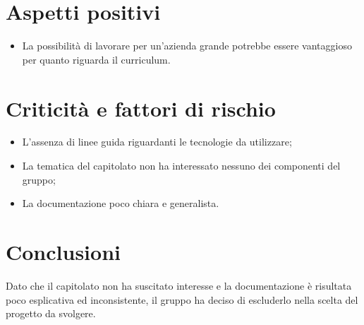 \section{Aspetti positivi}
\begin{itemize}
	\item La possibilità di lavorare per un'azienda grande potrebbe essere vantaggioso per quanto riguarda il curriculum.
\end{itemize}
\section{Criticità e fattori di rischio}
\begin{itemize}
	\item L'assenza di linee guida riguardanti le tecnologie da utilizzare;
	\item La tematica del capitolato non ha interessato nessuno dei componenti del gruppo;
	\item La documentazione poco chiara e generalista.
\end{itemize}
\section{Conclusioni}
Dato che il capitolato non ha suscitato interesse e la documentazione è risultata poco esplicativa ed inconsistente, il gruppo ha deciso di escluderlo nella scelta del progetto da svolgere.